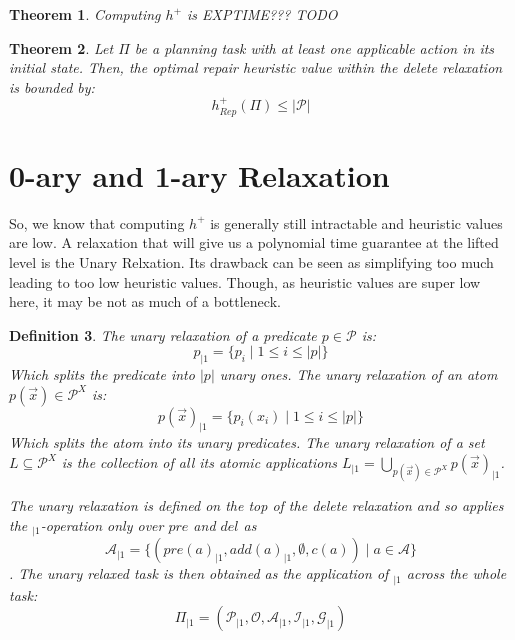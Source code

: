 \documentclass[twocolumn]{article}
\newcommand{\task}{\ensuremath{\Pi}\xspace}
\newcommand{\preds}{\ensuremath{\mathcal{P}}\xspace}
\newcommand{\acts}{\ensuremath{\mathcal{A}}\xspace}
\newcommand{\objects}{\ensuremath{\mathcal{O}}\xspace}
\newcommand{\init}{\ensuremath{\mathcal{I}}\xspace}
\newcommand{\goal}{\ensuremath{\mathcal{G}}\xspace}
\newcommand{\vars}{\ensuremath{X}\xspace}
\newcommand{\someVar}{\ensuremath{x}\xspace}
\newcommand{\atoms}{\ensuremath{\preds^{\vars}}\xspace}
\newcommand{\someAtom}{\ensuremath{p(\vec{\someVar})}\xspace}
\newcommand{\someLiftedSet}{\ensuremath{L}\xspace}
\newcommand{\somePred}{\ensuremath{p}\xspace}
\newcommand{\prename}{\ensuremath{pre}\xspace}
\newcommand{\addname}{\ensuremath{add}\xspace}
\newcommand{\delname}{\ensuremath{del}\xspace}
\newcommand{\pre}[1]{\ensuremath{\prename(#1)}\xspace}
\newcommand{\add}[1]{\ensuremath{\addname(#1)}\xspace}
\newcommand{\arity}[1]{\ensuremath{|#1|}}
\newcommand{\cost}[1]{\ensuremath{c(#1)}\xspace}
\newcommand{\someAct}{\ensuremath{a}\xspace}
\newcommand{\optimalHeuristicRel}{\ensuremath{h^{+}_{Rep}}\xspace}
\newcommand{\unary}[1]{\ensuremath{#1_{|1}}\xspace}
\newtheorem{theorem}{Theorem}
\newtheorem{definition}[theorem]{Definition}
\begin{document}
	
	
	\begin{theorem}
		Computing $h^+$ is EXPTIME??? TODO
	\end{theorem}
	
	
	
	\begin{theorem}
		Let \task be a planning task with at least one applicable action in its initial state.
		Then, the optimal repair heuristic value within the delete relaxation is bounded by:
		$$\optimalHeuristicRel(\task) \leq  \arity{\preds}$$
	\end{theorem}
	
	
	
	\section{0-ary and 1-ary Relaxation}
	
	So, 
	we know that computing $h^{+}$ 
	is generally still intractable and heuristic values are low.
	A relaxation that will give us a polynomial time guarantee at the lifted level is the Unary Relxation.
	Its drawback can be seen as simplifying too much leading to too low heuristic values.
	Though, as heuristic values are super low here, it may be not as much of a bottleneck.
	
	\begin{definition}
		The unary relaxation of a predicate $\somePred \in \preds$ is:
		$$
		\unary{\somePred} = \{\somePred_i \mid 1 \leq i \leq \arity{\somePred}\}
		$$
		Which splits the predicate into \arity{\somePred} unary ones.
		The unary relaxation of an atom $\someAtom \in \atoms$ is:
		$$
		\unary{\someAtom} =  \{\somePred_i(\someVar_i) \mid 1 \leq i \leq \arity{\somePred}\}
		$$
		Which splits the atom into its unary predicates.
		The unary relaxation of a set $\someLiftedSet \subseteq \atoms$ is the collection of all its atomic applications
		$
		\unary{\someLiftedSet} =  \bigcup_{\someAtom \in \atoms} \unary{\someAtom}
		$.
		
		The unary relaxation is defined on the top of the delete relaxation and so applies the {$\unary{}$}-operation only over \prename and \delname as
		$$
		\unary{\acts} = \{(\unary{\pre{\someAct}}, \unary{\add{\someAct}}, \emptyset, \cost{\someAct}) \mid \someAct \in \acts\}
		$$.
		The unary relaxed task is then obtained as the application of $\unary{}$ across the whole task:
		$$
		\unary{\task} = (\unary{\preds}, \objects, \unary{\acts}, \unary{\init}, \unary{\goal})
		$$
	\end{definition}
	
\end{document}
